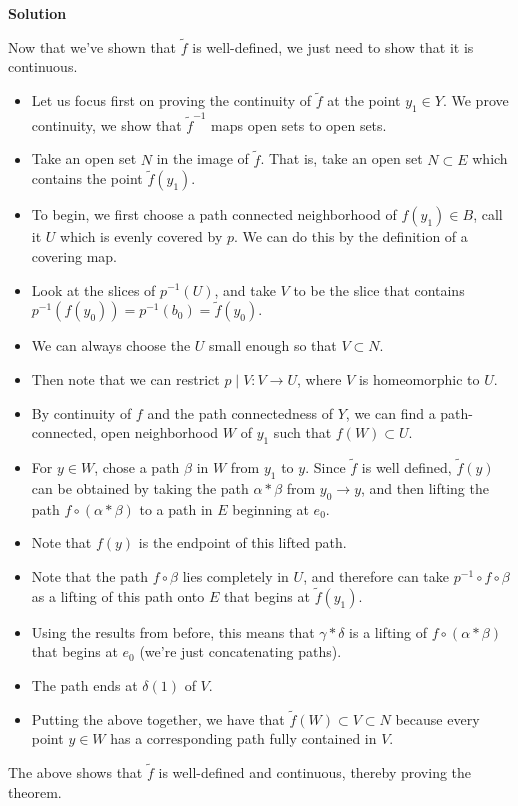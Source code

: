 \documentclass[12pt]{article}
\newcounter{AnswerCounter}
\newcounter{SubAnswerCounter}
\newenvironment{answer}[0]{
  \setcounter{SubAnswerCounter}{1}
  \bigskip
  \textbf{Solution \arabic{AnswerCounter}}
  \\
  \begin{small}
}{
  \end{small}
  \stepcounter{AnswerCounter}
}
\begin{document}
\begin{answer}
Now that we've shown that $\tilde{f}$ is well-defined, we just need to show that it is continuous.

\begin{itemize}
\item Let us focus first on proving the continuity of $\tilde{f}$ at the point $y_1 \in Y$. We prove continuity, we show that $\tilde{f}^{-1}$ maps open sets to open sets.
\item Take an open set $N$ in the image of $\tilde{f}$. That is, take an open set $N \subset E$ which contains the point $\tilde{f}(y_1)$.
\item To begin, we first choose a path connected neighborhood of $f(y_1) \in B$, call it $U$ which is evenly covered by $p$. We can do this by the definition of a covering map.
\item Look at the slices of $p^{-1}(U)$, and take $V$ to be the slice that contains $p^{-1}(f(y_0)) = p^{-1}(b_0) = \tilde{f}(y_0)$.
\item We can always choose the $U$ small enough so that $V \subset N$.
\item Then note that we can restrict $p \mid V : V \to U$, where $V$ is homeomorphic to $U$.
\item By continuity of $f$ and the path connectedness of $Y$, we can find a path-connected, open neighborhood $W$ of $y_1$ such that $f(W) \subset U$.
\item For $y \in W$, chose a path $\beta$ in $W$ from $y_1$ to $y$. Since $\tilde{f}$ is well defined, $\tilde{f}(y)$ can be obtained by taking the path $\alpha * \beta$ from $y_0 \to y$, and then lifting the path $f \circ (\alpha * \beta) $ to a path in $E$ beginning at $e_0$.
\item Note that $f(y)$ is the endpoint of this lifted path.
\item Note that the path $f \circ \beta$ lies completely in $U$, and therefore can take $p^{-1} \circ f \circ \beta$ as a lifting of this path onto $E$ that begins at $\tilde{f}(y_1)$.
\item Using the results from before, this means that $\gamma * \delta$ is a lifting of $f\circ (\alpha * \beta)$ that begins at $e_0$ (we're just concatenating paths).
\item The path ends at $\delta(1)$ of $V$.
\item Putting the above together, we have that $\tilde{f}(W) \subset V \subset N$ because every point $y \in W$ has a corresponding path fully contained in $V$.
\end{itemize}
The above shows that $\tilde{f}$ is well-defined and continuous, thereby proving the theorem.
\end{answer}
\end{document}
